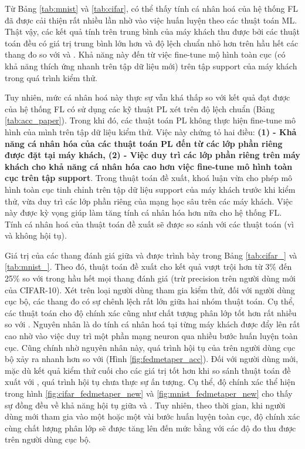 Từ Bảng \ref{tab:mnist} và \ref{tab:cifar}, có thể thấy tính cá nhân hoá của hệ thống FL đã được cải thiện rất nhiều lần nhờ vào việc huấn luyện theo các thuật toán ML. Thật vậy, các kết quả tính trên trung bình của máy khách thu được bởi các thuật toán  đều có giá trị trung bình lớn hơn và độ lệch chuẩn nhỏ hơn trên hầu hết các thang đo so với  và . Khả năng này đến từ việc fine-tune mộ hình toàn cục (có khả năng thích ứng nhanh trên tập dữ liệu mới) trên tập support của máy khách trong quá trình kiểm thử.

Tuy nhiên, mức cá nhân hoá này thực sự vẫn khá thấp so với kết quả đạt được của hệ thống FL có sử dụng các kỹ thuật PL xét trên độ lệch chuẩn (Bảng \ref{tab:acc_paper}). Trong khi đó, các thuật toán PL không thực hiện fine-tune mô hình của mình trên tập dữ liệu kiểm thử. Việc này chứng tỏ hai điều: \textbf{(1) - Khả năng cá nhân hóa của các thuật toán PL đến từ các lớp phần riêng được đặt tại máy khách, (2) - Việc duy trì các lớp phần riêng trên máy khách cho khả năng cá nhân hóa cao hơn việc fine-tune mô hình toàn cục trên tập support}. Trong thuật toán đề xuất, khoá luận vừa cho phép mô hình toàn cục tinh chỉnh trên tập dữ liệu support của máy khách trước khi kiểm thử, vừa duy trì các lớp phần riêng của mạng học sâu trên các máy khách. Việc này được kỳ vọng giúp làm tăng tính cá nhân hóa hơn nữa cho hệ thống FL. Tính cá nhân hoá của thuật toán đề xuất sẽ được so sánh với các thuật toán  (vì  và  không hội tụ).

Giá trị của các thang đánh giá giữa  và  được trình bày trong Bảng \ref{tab:cifar_} và \ref{tab:mnist_}. Theo đó, thuật toán đề xuất cho kết quả vượt trội hơn từ 3\% đến 25\% so với  trong hầu hết mọi thang đánh giá (trừ precision trên người dùng mới của CIFAR-10). Xét trên loại người dùng tham gia kiểm thử, đối với người dùng cục bộ, các thang đo có sự chênh lệch rất lớn giữa hai nhóm thuật toán. Cụ thể, các thuật toán  cho độ chính xác cũng như chất tượng phân lớp tốt hơn rất nhiều so với . Nguyên nhân là do tính cá nhân hoá tại từng máy khách được đẩy lên rất cao nhờ vào việc duy trì một phần mạng neuron qua nhiều bước huấn luyện toàn cục. Cũng chính nhờ nguyên nhân này, quá trình hội tụ của  trên người dùng cục bộ xảy ra nhanh hơn so với  (Hình \ref{fig:fedmetaper_acc}). Đối với người dùng mới, mặc dù kết quả kiểm thử cuối cho các giá trị tốt hơn khi so sánh thuật toán đề xuất với , quá trình hội tụ chưa thực sự ấn tượng. Cụ thể, độ chính xác thể hiện trong hình \ref{fig:cifar_fedmetaper_new} và \ref{fig:mnist_fedmetaper_new} cho thấy sự đồng đều về khả năng hội tụ giữa  và . Tuy nhiên, theo thời gian, khi người dùng mới tham gia vào một hoặc một vài bước huấn luyện toàn cục, độ chính xác cùng chất lượng phân lớp sẽ được tăng lên đến mức bằng với các độ đo thu được trên người dùng cục bộ.

